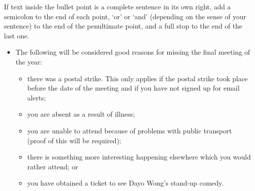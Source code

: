 \documentclass[11pt,a4paper]{book}
\newcommand{\cmark}{{\color{green(html/cssgreen)}\checkmark}}%
\begin{document}
		If text inside the bullet point is a complete sentence in its own right, add a semicolon to the end of each point, `or' or `and' (depending on the sense of your sentence) to the end of the penultimate point, and a full stop to the end of the last one.
		{\firasans \begin{mdframed}[backgroundcolor=aliceblue] \begin{itemize}[label=\cmark]
			\item The following will be considered good reasons for missing the final meeting of the year: \begin{itemize}[label=\bullet]
				\item there was a postal strike. This only applies if the postal strike took place before the date of the meeting and if you have not signed up for email alerts;
				\item you are absent as a result of illness;
				\item you are unable to attend because of problems with public transport (proof of this will be required);
				\item there is something more interesting happening elsewhere which you would rather attend; or
				\item you have obtained a ticket to see Dayo Wong's stand-up comedy.
			\end{itemize} 
		\end{itemize} \end{mdframed} }
\end{document}
